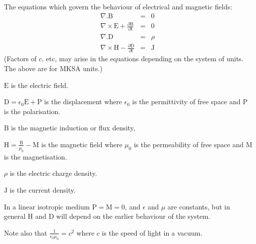 The equations which govern the behaviour of electrical
and magnetic fields:
\begin{eqnarray*}
  \nabla . \mathrm{B} &=& 0 \\
  \nabla \times \mathrm{E} + \frac{\partial \mathrm{B}}{\partial \mathrm{t}} &=& 0 \\
  \nabla . \mathrm{D} &=& \rho \\
  \nabla \times \mathrm{H} - \frac{\partial \mathrm{D}}{\partial \mathrm{t}} &=& 
\mathrm{J} \
\end{eqnarray*}
(Factors of $c$, etc, may arise in the equations depending on the system of
units. The above are for MKSA units.)
\par
$\mathrm{E}$ is the electric field.
\par
$ \mathrm{D} = \epsilon_{0} \mathrm{E} + \mathrm{P} $
is the displacement where $ \epsilon_{0} $ is the permittivity of free space and $\mathrm{P}$ is the
polarisation.
\par
$\mathrm{B}$ is the magnetic induction or flux density,
\par
$ \mathrm{H} = \frac{\mathrm{B}}{\mu
_{0}} - \mathrm{M} $ is the magnetic field where $ \mu _{0} $ is the permeability of free space and $\mathrm{M}$ is the magnetisation.
\par
 $ \rho $ is the electric charge density.
\par
 $\mathrm{J}$ is the current density.
\par
In a linear isotropic medium $\mathrm{P}=\mathrm{M}=0$, and $ \epsilon $ and $ \mu $ are constants, 
but in general $\mathrm{H}$ and $\mathrm{D}$ will depend on the earlier behaviour of the system.
\par
Note also that $ \frac{1}{\epsilon_{0} \mu_{0}} = c^2 $ where $c$ is
the speed of light in a vacuum.
